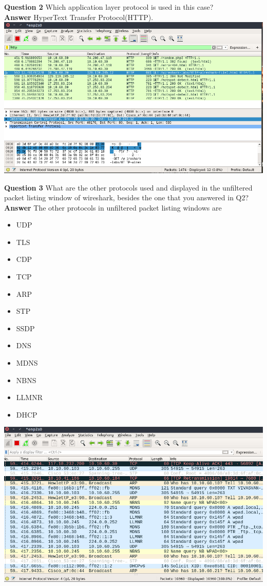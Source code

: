 \documentclass[14pt]{extarticle}
\begin{document}
    \noindent
    \textbf{\large Question 2}
    Which application layer protocol is used in this case?\\[10pt]
    \textbf{\large Answer}
    HyperText Transfer Protocol(HTTP).\\[8pt]
    \includegraphics[scale=0.45]{2}
    \vspace{1cm}


    \noindent
    \textbf{\large Question 3}
    What are the other protocols used and displayed in the unfiltered packet listing window of
    wireshark, besides the one that you answered in Q2?\\[10pt]
    \textbf{\large Answer}
    The other protocols in unfiltered packet listing windows are
    \begin{itemize}
        \item UDP
        \item TLS
        \item CDP
        \item TCP
        \item ARP
        \item STP
        \item SSDP
        \item DNS
        \item MDNS
        \item NBNS
        \item LLMNR
        \item DHCP
    \end{itemize}
    \includegraphics[scale=0.45]{3}
    \vspace{1cm}
\end{document}
